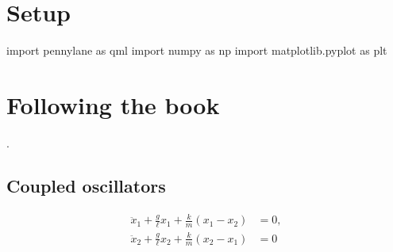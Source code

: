 \section{Setup}


\begin{python}
import pennylane as qml
import numpy as np
import matplotlib.pyplot as plt
\end{python}

\begin{comment}
\begin{result}
\end{result}
\end{comment}

\newpage

\section{Following the book}
.

\subsection{Coupled oscillators}

\[
\begin{aligned}
  \ddot{x}_1 + \frac{g}{\ell} x_1 + \frac{k}{m} (x_1 - x_2) &= 0, \\
  \ddot{x}_2 + \frac{g}{\ell} x_2 + \frac{k}{m} (x_2 - x_1) &= 0
\end{aligned}
\]


